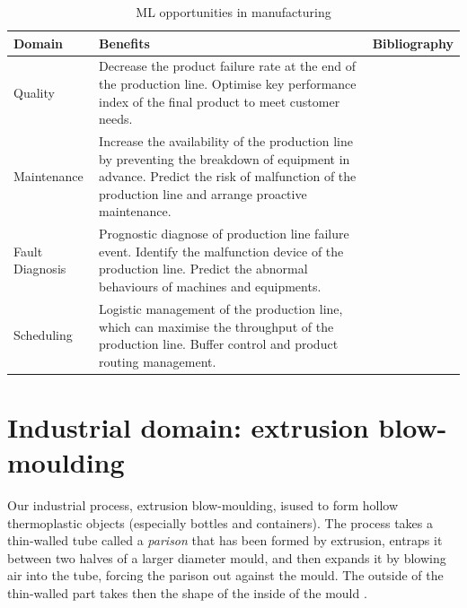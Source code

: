 \begin{table}
\label{tab:ai_benefits}
\caption{ML opportunities in manufacturing}
\begin{tabular}{|l|p{6cm}|p{4cm}|}
\hline
%
Domain &
  Benefits &
    Bibliography \\ \hline
Quality  &
  Decrease the product failure rate at the end of the production line. Optimise key performance index of the final product to meet customer needs. &
    \citep{lieber2013quality, li2018ensemble, chen2008neural, nagorny2017quality, haeussler1996quality} \\ \hline

Maintenance &
  Increase the availability of the production line by preventing the breakdown of equipment in advance. Predict the risk of malfunction of the production line and arrange proactive maintenance. &
    \citep{nguyen2019new, lee2017application, einabadi2019dynamic, li2017intelligent, liu2016prediction}\\ \hline
Fault Diagnosis &
  Prognostic diagnose of production line failure event. Identify the malfunction device of the production line. Predict the abnormal behaviours of machines and equipments. & \citep{toma2020bearing, wong2006modified, chen2014fault, malik2017artificial, arabaci2010automatic} \\ \hline
Scheduling  &
  Logistic management of the production line, which can maximise the throughput of the production line. Buffer control and product routing management. & \citep{morariu2020machine, woschank2020review, lolli2019machine, zhang2019review, gomes2016developing} \\ \hline
\end{tabular}
\end{table}


\section{Industrial domain: extrusion blow-moulding} \label{Industrial domain: extrusion blow-moulding}

Our industrial process, extrusion blow-moulding, isused to form hollow thermoplastic objects (especially bottles and containers). The process takes a thin-walled tube called a \textit{parison} that has been formed by extrusion, entraps it between two halves of a larger diameter mould, and then expands it by blowing air into the tube, forcing the parison out against the mould. The outside of the thin-walled part takes then the shape of the inside of the mould \citep{poli2001design}.

